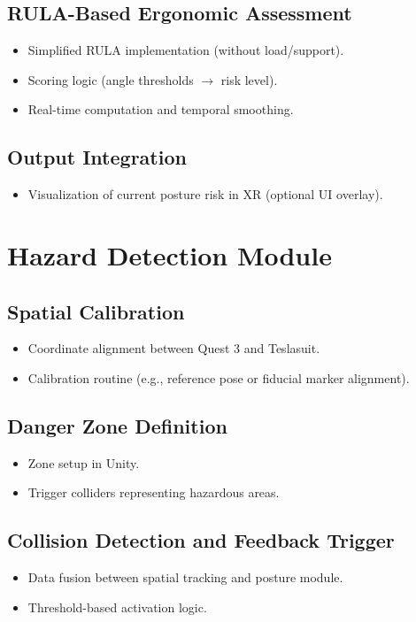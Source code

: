 \subsection{RULA-Based Ergonomic Assessment}
\begin{itemize}
    \item Simplified RULA implementation (without load/support).
    \item Scoring logic (angle thresholds $\rightarrow$ risk level).
    \item Real-time computation and temporal smoothing.
\end{itemize}

\subsection{Output Integration}
\begin{itemize}
    \item Visualization of current posture risk in XR (optional UI overlay).
\end{itemize}

\section{Hazard Detection Module}
\subsection{Spatial Calibration}
\begin{itemize}
    \item Coordinate alignment between Quest 3 and Teslasuit.
    \item Calibration routine (e.g., reference pose or fiducial marker alignment).
\end{itemize}

\subsection{Danger Zone Definition}
\begin{itemize}
    \item Zone setup in Unity.
    \item Trigger colliders representing hazardous areas.
\end{itemize}

\subsection{Collision Detection and Feedback Trigger}
\begin{itemize}
    \item Data fusion between spatial tracking and posture module.
    \item Threshold-based activation logic.
\end{itemize}

